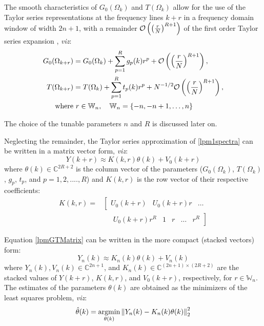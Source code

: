 The smooth characteristics of $G_0(\Omega_k)$ and $T(\Omega_k)$ allow for the use of the Taylor series representations at the frequency lines $k+r$ in a frequency domain window of width $2n+1$, with a remainder $\mathcal{O} \left( \left(\frac{r}{N}\right)^{R+1} \right)$ of the first order Taylor series expansion \citep{Schoukens2009LPM}, \emph{viz}:
\begin{align}\label{lpmGTaylorS}
G_0(\Omega_{k+r})&=G_0(\Omega_k)+\sum_{p=1}^{R}g_p(k)r^p+
\mathcal{O} \left( \left(\frac{r}{N}\right)^{R+1} \right),
\\
\label{lpmTTaylorS}
T(\Omega_{k+r})&=T(\Omega_k)+\sum_{p=1}^{R}t_p(k)r^p+N^{-1/2}
\mathcal{O} \left(   \left(\frac{r}{N}\right)^{R+1}   \right)
,
\\
\text{where}&\ r\in\mathbb{W}_n,\quad \mathbb{W}_n = \{-n,-n+1,\dots,n\}
\end{align}

The choice of the tunable parameters $n$ and $R$ is discussed later on.

Neglecting the remainder, the Taylor series approximation of \eqref{lpm1spectra} can be written in a matrix vector form, \emph{viz}:
\begin{equation}\label{lpmGTMatrix}
Y(k+r)\approx{K(k, r)\theta(k)+V_0(k+r)}
\end{equation}
where $\theta(k)\in\mathbb{C}^{2R+2}$ is the column vector of the  parameters ($G_0(\Omega_k)$, $T(\Omega_k)$, $g_p$, $t_p$, and $p = 1, 2, ...., R$) and $K(k, r)$ is the row vector of their respective coefficients:
\begin{align}
K(k,r) = &\left[
\begin{matrix}
U_0(k+r) & U_0(k+r)r & \dots
\end{matrix}
\right.
\\
&\quad\left.\begin{matrix}U_0(k+r)r^R & 1& r&\dots&r^R\end{matrix}\right]\nonumber
\end{align}


Equation \eqref{lpmGTMatrix} can be written in the more compact (stacked vectors) form:
\begin{equation}\label{lpmGTMatrixStack}
Y_n(k)\approx K_n(k)\theta(k)+V_n(k)
\end{equation}
where $Y_n(k), V_n(k)\in\mathbb{C}^{2n+1}$, and $K_n(k)\in\mathbb{C}^{(2n+1)\times(2R+2)}$ are the stacked values of $Y(k+r)$, $K(k,r)$, and $V_0(k+r)$, respectively, for $r\in\mathbb{W}_n$.
The estimates of the parameters $\theta(k)$ are obtained as the minimizers of the least squares problem, \emph{viz}:
\begin{align}\label{eq:LSsolutionLPM}
\hat\theta(k) = \operatorname*{argmin}_{\theta(k)} \left\|Y_n(k) - K_n(k)\theta(k)\right\|_2^2
\end{align}

